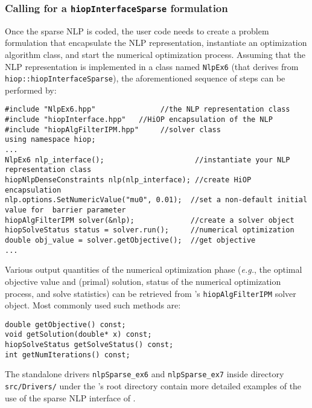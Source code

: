 \subsubsection{Calling \Hi for a \texttt{hiopInterfaceSparse} formulation}
Once the sparse NLP is coded,  the  user code needs to create a \Hi problem formulation that encapsulate the NLP representation, instantiate an optimization algorithm class, and start the numerical optimization process. Assuming that the NLP representation is implemented in a class named \texttt{NlpEx6} (that derives from \texttt{hiop::hiopInterfaceSparse}), the aforementioned sequence of steps can be performed by:
\begin{lstlisting}
#include "NlpEx6.hpp"               //the NLP representation class
#include "hiopInterface.hpp"   //HiOP encapsulation of the NLP
#include "hiopAlgFilterIPM.hpp"     //solver class
using namespace hiop;
...
NlpEx6 nlp_interface();                     //instantiate your NLP representation class
hiopNlpDenseConstraints nlp(nlp_interface); //create HiOP encapsulation
nlp.options.SetNumericValue("mu0", 0.01);  //set a non-default initial value for  barrier parameter
hiopAlgFilterIPM solver(&nlp);             //create a solver object
hiopSolveStatus status = solver.run();     //numerical optimization
double obj_value = solver.getObjective();  //get objective
...
\end{lstlisting}
Various output quantities of the numerical optimization phase (\textit{e.g.}, the optimal objective value and (primal) solution, status of the numerical optimization process, and solve statistics) can be retrieved from \Hi's \texttt{hiopAlgFilterIPM} solver object. Most commonly used such methods are: 
\begin{lstlisting}
double getObjective() const;
void getSolution(double* x) const;
hiopSolveStatus getSolveStatus() const;
int getNumIterations() const;
\end{lstlisting} 
The standalone drivers \texttt{nlpSparse\_ex6} and \texttt{nlpSparse\_ex7} inside directory \texttt{src/Drivers/} under the \Hi's root directory contain more detailed examples of the use of the sparse NLP interface of \Hi.
